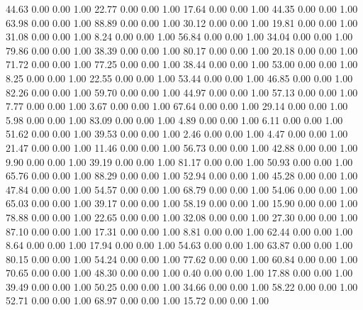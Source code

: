    44.63   0.00   0.00   1.00
   22.77   0.00   0.00   1.00
   17.64   0.00   0.00   1.00
   44.35   0.00   0.00   1.00
   63.98   0.00   0.00   1.00
   88.89   0.00   0.00   1.00
   30.12   0.00   0.00   1.00
   19.81   0.00   0.00   1.00
   31.08   0.00   0.00   1.00
    8.24   0.00   0.00   1.00
   56.84   0.00   0.00   1.00
   34.04   0.00   0.00   1.00
   79.86   0.00   0.00   1.00
   38.39   0.00   0.00   1.00
   80.17   0.00   0.00   1.00
   20.18   0.00   0.00   1.00
   71.72   0.00   0.00   1.00
   77.25   0.00   0.00   1.00
   38.44   0.00   0.00   1.00
   53.00   0.00   0.00   1.00
    8.25   0.00   0.00   1.00
   22.55   0.00   0.00   1.00
   53.44   0.00   0.00   1.00
   46.85   0.00   0.00   1.00
   82.26   0.00   0.00   1.00
   59.70   0.00   0.00   1.00
   44.97   0.00   0.00   1.00
   57.13   0.00   0.00   1.00
    7.77   0.00   0.00   1.00
    3.67   0.00   0.00   1.00
   67.64   0.00   0.00   1.00
   29.14   0.00   0.00   1.00
    5.98   0.00   0.00   1.00
   83.09   0.00   0.00   1.00
    4.89   0.00   0.00   1.00
    6.11   0.00   0.00   1.00
   51.62   0.00   0.00   1.00
   39.53   0.00   0.00   1.00
    2.46   0.00   0.00   1.00
    4.47   0.00   0.00   1.00
   21.47   0.00   0.00   1.00
   11.46   0.00   0.00   1.00
   56.73   0.00   0.00   1.00
   42.88   0.00   0.00   1.00
    9.90   0.00   0.00   1.00
   39.19   0.00   0.00   1.00
   81.17   0.00   0.00   1.00
   50.93   0.00   0.00   1.00
   65.76   0.00   0.00   1.00
   88.29   0.00   0.00   1.00
   52.94   0.00   0.00   1.00
   45.28   0.00   0.00   1.00
   47.84   0.00   0.00   1.00
   54.57   0.00   0.00   1.00
   68.79   0.00   0.00   1.00
   54.06   0.00   0.00   1.00
   65.03   0.00   0.00   1.00
   39.17   0.00   0.00   1.00
   58.19   0.00   0.00   1.00
   15.90   0.00   0.00   1.00
   78.88   0.00   0.00   1.00
   22.65   0.00   0.00   1.00
   32.08   0.00   0.00   1.00
   27.30   0.00   0.00   1.00
   87.10   0.00   0.00   1.00
   17.31   0.00   0.00   1.00
    8.81   0.00   0.00   1.00
   62.44   0.00   0.00   1.00
    8.64   0.00   0.00   1.00
   17.94   0.00   0.00   1.00
   54.63   0.00   0.00   1.00
   63.87   0.00   0.00   1.00
   80.15   0.00   0.00   1.00
   54.24   0.00   0.00   1.00
   77.62   0.00   0.00   1.00
   60.84   0.00   0.00   1.00
   70.65   0.00   0.00   1.00
   48.30   0.00   0.00   1.00
    0.40   0.00   0.00   1.00
   17.88   0.00   0.00   1.00
   39.49   0.00   0.00   1.00
   50.25   0.00   0.00   1.00
   34.66   0.00   0.00   1.00
   58.22   0.00   0.00   1.00
   52.71   0.00   0.00   1.00
   68.97   0.00   0.00   1.00
   15.72   0.00   0.00   1.00
